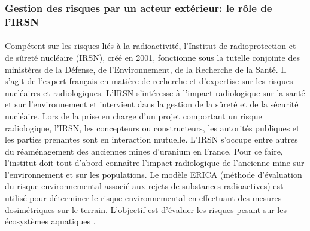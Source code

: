 \documentclass{article}
\begin{document}

\subsubsection{Gestion des risques par un acteur extérieur: le rôle de l’IRSN}

\paragraph{} Compétent sur les risques liés à la radioactivité, l'Institut de radioprotection et de sûreté nucléaire (IRSN), créé en 2001, fonctionne sous la tutelle conjointe des ministères de la Défense, de l’Environnement, de la Recherche de la Santé. Il s’agit de l’expert français en matière de recherche et d’expertise sur les risques nucléaires et radiologiques. L’IRSN s’intéresse à l’impact radiologique sur la santé et sur l'environnement et intervient dans la gestion de la sûreté et de la sécurité nucléaire. Lors de la prise en charge d’un projet comportant un risque radiologique, l’IRSN, les concepteurs ou constructeurs, les autorités publiques et les parties prenantes sont en interaction mutuelle. L’IRSN s’occupe entre autres du réaménagement des anciennes mines d’uranium en France. Pour ce faire, l’institut doit tout d’abord connaître l’impact radiologique de l’ancienne mine sur l’environnement et sur les populations. Le modèle ERICA (méthode d’évaluation du risque environnemental associé aux rejets de substances radioactives) est utilisé pour déterminer le risque environnemental en effectuant des mesures dosimétriques sur le terrain. L'objectif est d'évaluer les risques pesant sur les écosystèmes aquatiques \cite{dublineau_gestion_2020}.
\end{document}
